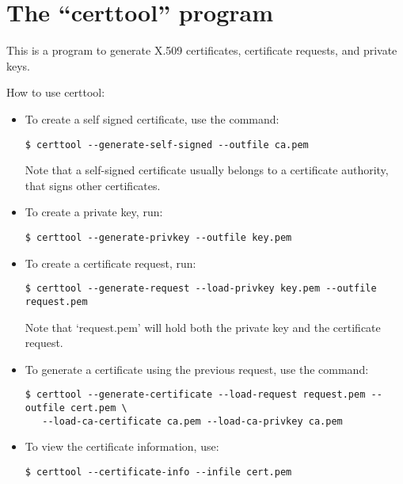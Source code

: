 \section{The ``certtool'' program}

This is a program to generate X.509 certificates, certificate requests, and
private keys.

How to use certtool:

\begin{itemize}

\item To create a self signed certificate, use the command:
\begin{verbatim}
$ certtool --generate-self-signed --outfile ca.pem
\end{verbatim}
Note that a self-signed certificate usually belongs to a certificate
authority, that signs other certificates.

\item To create a private key, run:
\begin{verbatim}
$ certtool --generate-privkey --outfile key.pem
\end{verbatim}

\item To create a certificate request, run:
\begin{verbatim}
$ certtool --generate-request --load-privkey key.pem --outfile request.pem
\end{verbatim}
Note that `request.pem' will hold both the private key and the certificate
request.

\item To generate a certificate using the previous request, use the command:
\begin{verbatim}
$ certtool --generate-certificate --load-request request.pem --outfile cert.pem \
   --load-ca-certificate ca.pem --load-ca-privkey ca.pem
\end{verbatim}

\item To view the certificate information, use:
\begin{verbatim}
$ certtool --certificate-info --infile cert.pem
\end{verbatim}


\end{itemize}

